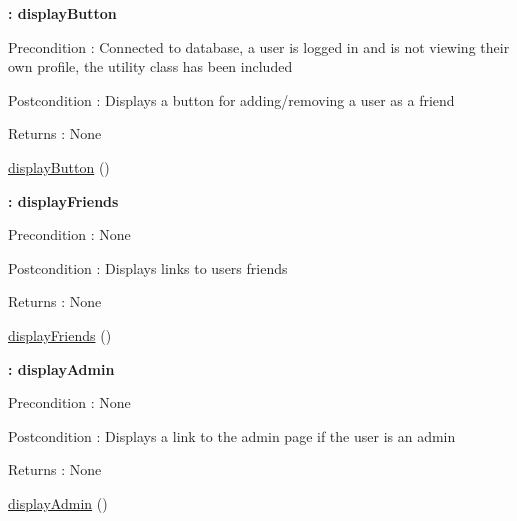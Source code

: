 \begin{Indent}{\bf \+: display\+Button}\par
{\em \begin{DoxyPrecond}{Precondition}
\+: Connected to database, a user is logged in and is not viewing their own profile, the utility class has been included 
\end{DoxyPrecond}
\begin{DoxyPostcond}{Postcondition}
\+: Displays a button for adding/removing a user as a friend 
\end{DoxyPostcond}
\begin{DoxyReturn}{Returns}
\+: None 
\end{DoxyReturn}
}\begin{DoxyCompactItemize}
\item 
\hyperlink{class_profile_a66864332d3b1a149eca4a5d25bc1a688}{display\+Button} ()
\end{DoxyCompactItemize}
\end{Indent}
\begin{Indent}{\bf \+: display\+Friends}\par
{\em \begin{DoxyPrecond}{Precondition}
\+: None 
\end{DoxyPrecond}
\begin{DoxyPostcond}{Postcondition}
\+: Displays links to user\textquotesingle{}s friends 
\end{DoxyPostcond}
\begin{DoxyReturn}{Returns}
\+: None 
\end{DoxyReturn}
}\begin{DoxyCompactItemize}
\item 
\hyperlink{class_profile_a5962c39a1c9c07c5f01becc63491263d}{display\+Friends} ()
\end{DoxyCompactItemize}
\end{Indent}
\begin{Indent}{\bf \+: display\+Admin}\par
{\em \begin{DoxyPrecond}{Precondition}
\+: None 
\end{DoxyPrecond}
\begin{DoxyPostcond}{Postcondition}
\+: Displays a link to the admin page if the user is an admin 
\end{DoxyPostcond}
\begin{DoxyReturn}{Returns}
\+: None 
\end{DoxyReturn}
}\begin{DoxyCompactItemize}
\item 
\hyperlink{class_profile_a81235d7741b262e8afee70476cdc6150}{display\+Admin} ()
\end{DoxyCompactItemize}
\end{Indent}



